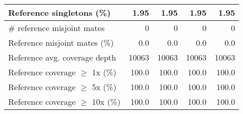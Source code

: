 \documentclass[12pt,a4paper]{article}
\begin{document}
\begin{table}[ht]
\begin{center}
\begin{tabular}{|l*{4}{|r}|}
Reference singletons (\%) & 1.95 & 1.95 & 1.95 & 1.95 \\ \hline
\# reference misjoint mates & 0 & 0 & 0 & 0 \\ \hline
Reference misjoint mates (\%) & 0.0 & 0.0 & 0.0 & 0.0 \\ \hline
Reference avg. coverage depth & 10063 & 10063 & 10063 & 10063 \\ \hline
Reference coverage $\geq$ 1x (\%) & 100.0 & 100.0 & 100.0 & 100.0 \\ \hline
Reference coverage $\geq$ 5x (\%) & 100.0 & 100.0 & 100.0 & 100.0 \\ \hline
Reference coverage $\geq$ 10x (\%) & 100.0 & 100.0 & 100.0 & 100.0 \\ \hline
\end{tabular}
\end{center}
\end{table}
\end{document}
